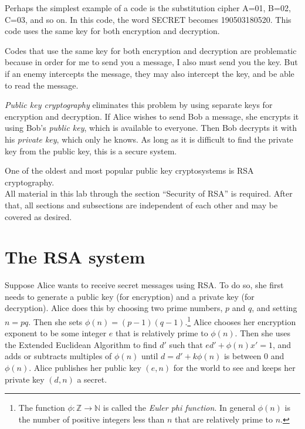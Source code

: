 
Perhaps the simplest example of a code is the substitution cipher A=01, B=02, C=03, and so on.
In this code, the word SECRET becomes 190503180520.
This code uses the same key for both encryption and decryption.

Codes that use the same key for both encryption and decryption are problematic because in order for me to send you a message, I also must send you the key.
But if an enemy intercepts the message, they may also intercept the key, and be able to read the message.

\emph{Public key cryptography} eliminates this problem by using separate keys for encryption and decryption.
If Alice wishes to send Bob a message, she encrypts it using Bob's \emph{public key}, which is available to everyone.
Then Bob decrypts it with his \emph{private key}, which only he knows.
As long as it is difficult to find the private key from the public key, this is a secure system.

One of the oldest and most popular public key cryptosystems is RSA cryptography.\\

All material in this lab through the section ``Security of RSA'' is required. 
After that, all sections and subsections are independent of each other and may be covered as desired.

\section*{The RSA system}
Suppose Alice wants to receive secret messages using RSA.
To do so, she first needs to generate a public key (for encryption) and a private key (for decryption).
Alice does this by choosing two prime numbers, $p$ and $q$, and setting $n=pq$.
Then she sets $\phi(n) = (p-1)(q-1)$.\footnote{
The function $\phi: \mathbb{Z} \rightarrow \mathbb{N}$ is called the \emph{Euler phi function}. In general $\phi(n)$ is the number of positive integers less than $n$ that are relatively prime to $n$.}
Alice chooses her encryption exponent to be some integer $e$ that is relatively prime to $\phi(n)$.
Then she uses the Extended Euclidean Algorithm to find $d'$ such that $ed' + \phi(n)x' = 1$, and adds or subtracts multiples of $\phi(n)$ until $d = d'+k\phi(n)$ is between 0 and $\phi(n)$.
Alice publishes her public key $(e, n)$ for the world to see and keeps her private key $(d,n)$ a secret.

